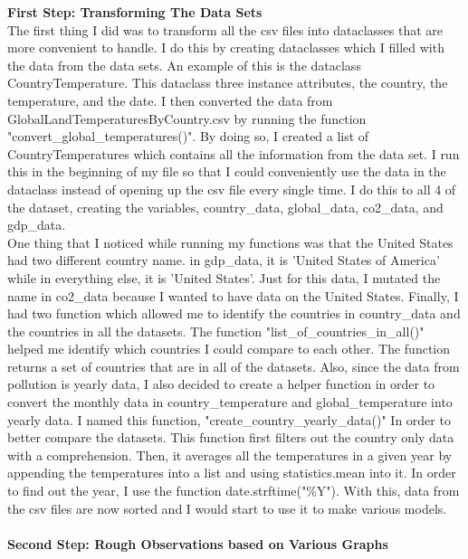 \documentclass[fontsize=11pt]{article}
\begin{document}
\textbf{First Step: Transforming The Data Sets} \\
The first thing I did was to transform all the csv files into dataclasses that are more convenient to handle. I do this by creating dataclasses which I filled with the data from the data sets. An example of this is the dataclass CountryTemperature. This dataclass three instance attributes, the country, the temperature, and the date. I then converted the data from GlobalLandTemperaturesByCountry.csv by running the function "convert\_global\_temperatures()". By doing so, I created a list of CountryTemperatures which contains all the information from the data set. I run this in the beginning of my file so that I could conveniently use the data in the dataclass instead of opening up the csv file every single time. I do this to all 4 of the dataset, creating the variables, country\_data, global\_data, co2\_data, and gdp\_data. 
\\
One thing that I noticed while running my functions was that the United States had two different country name. in gdp\_data, it is 'United States of America' while in everything else, it is 'United States'. Just for this data, I mutated the name in co2\_data because I wanted to have data on the United States. Finally, I had two function which allowed me to identify the countries in country\_data and the countries in all the datasets. The function "list\_of\_countries\_in\_all()" helped me identify which countries I could compare to each other. The function returns a set of countries that are in all of the datasets. Also, since the data from pollution is yearly data, I also decided to create a helper function in order to convert the monthly data in country\_temperature and global\_temperature into yearly data. I named this function, "create\_country\_yearly\_data()" In order to better compare the datasets. This function first filters out the country only data with a comprehension. Then, it averages all the temperatures in a given year by appending the temperatures into a list and using statistics.mean into it. In order to find out the year, I use the function date.strftime("\%Y"). With this, data from the csv files are now sorted and I would start to use it to make various models.
\\\\
\textbf{Second Step: Rough Observations based on Various Graphs}
\\
\end{document}
